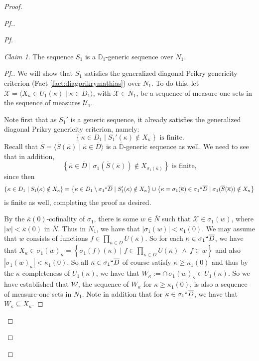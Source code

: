 \documentclass{amsart}
\theoremstyle{definition}
\theoremstyle{remark}
\newtheorem{claimno}{Claim}
\newcommand{\D}{\mathbb{D}}
\newcommand{\N}{{\overline{N}}}
\renewcommand{\S}{{\overline{S}}}
\newcommand{\U}{\mathcal{U}}
\newcommand{\st}{\; | \;}
\newcommand{\set}[2]{\left\{#1\st #2 \right\}}
\newcommand{\seq}[2]{\langle #1 \st #2 \rangle}
\begin{document}
\begin{proof}
\begin{proof}[Pf.]
\begin{proof}[Pf]
\begin{claimno} The sequence $S_1$ is a $\D_1$-generic sequence over $N_1$. \end{claimno}
\begin{proof}[Pf.]
We will show that $S_1$ satisfies the generalized diagonal Prikry genericity criterion (Fact \ref{fact:diagprikrymathias}) over $N_1$. To do this, let $\mathcal X = \seq{ X_\kappa \in U_1(\kappa) }{ \kappa \in D_1 }$, with $\mathcal X \in N_1$, be a sequence of measure-one sets in the sequence of measures $\U_1$.

Note first that as $S_1'$ is a generic sequence, it already satisfies the generalized diagonal Prikry genericity criterion, namely:
$$\set{ \kappa \in D_1}{ S_1'(\kappa) \notin X_\kappa } \text{ is finite.}$$
Recall that $\S = \seq{ \S(\overline \kappa) }{ \overline \kappa \in \overline D }$ is a $\overline{\D}$-generic sequence as well.
We need to see that in addition,
$$\set{ \overline \kappa \in \overline D}{\sigma_1(\S(\overline \kappa)) \notin X_{\sigma_1(\overline \kappa)} }  \text{ is finite,}$$
since then 
$$\set{ \kappa \in D_1}{ S_1(\kappa) \notin X_\kappa } = \set{ \kappa \in D_1 \setminus \sigma_1``\overline D}{ S_1'(\kappa) \notin X_\kappa } \cup \set{ \kappa = \sigma_1(\overline \kappa) \in \sigma_1``\overline D}{\sigma_1(\S(\overline \kappa)) \notin X_\kappa }$$
is finite as well, completing the proof as desired.

By the $\overline{\kappa}(0)$-cofinality of $\sigma_1$, there is some $w \in \N$ such that $\mathcal X \in \sigma_1(w)$, where $|w| < \overline{\kappa}(0)$ in $\N$. Thus in $N_1$, we have that $|\sigma_1(w)| < \kappa_1(0)$. 
We may assume that $w$ consists of functions $f \in \prod_{\overline \kappa \in \overline D} \overline U(\overline \kappa)$.
So for each $\kappa \in \sigma_1``\overline D$, we have that $X_\kappa \in \sigma_1(w)_\kappa = \set{\sigma_1(f)(\overline \kappa) }{ f \in \prod_{\overline \kappa \in \overline D} \overline U(\overline \kappa) \ \land \ f \in w }$ and also $|\sigma_1(w)_\kappa|<\kappa_1(0).$ So all $\kappa \in \sigma_1``\overline D$ of course satisfy $\kappa \geq \kappa_1(0)$ and thus by the $\kappa$-completeness of $U_1(\kappa)$, we have that $W_\kappa := \cap \, \sigma_1(w)_\kappa \in  U_1(\kappa).$
So we have established that $\mathcal W$, the sequence of $W_\kappa$ for $\kappa \geq \kappa_1(0)$, is also a sequence of measure-one sets in $N_1$. Note in addition that for $\kappa \in \sigma_1``\overline D$, we have that $W_\kappa \subseteq X_\kappa$. 


\end{proof}
\end{proof}
\end{proof}
\end{proof}
\end{document}
